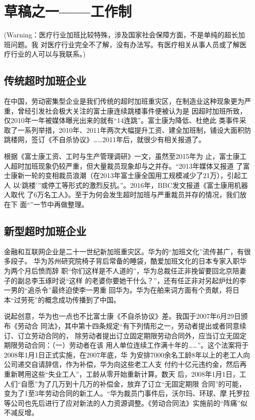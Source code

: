 \chapter{草稿之一——工作制}

(Warning：医疗行业加班比较特殊，涉及国家社会保障方面，不是单纯的超长加班问题。我
对医疗行业完全不了解，没有办法写。有医疗相关从事人员或了解医疗行业的人可以与我联系。)

\section{传统超时加班企业}
在中国，劳动密集型企业是我们传统的超时加班重灾区，在制造业这种现象更为严
重\cite{guojilaogongshijian}，曾经引发社会极大关注的富士康连续跳楼事件便被认为是
因超时加班所致，仅2010年一年被媒体曝光出来的就有“14连跳”。富士康为降低、杜绝此
类事件采取了一系列举措，2010年、2011年两次大幅提升工资、建全加班制，铺设大面积防
跳楼网，签订《不自杀协议》……2011年后，就很少有相关报道了。

根据《富士康工资、工时与生产管理调研》\cite{fushikangzuixin}一文，虽然至2015年为
止，富士康工人超时加班现象仍较严重，但大量裁员现象却与之并存。“2013年媒体又报道
了富士康新一轮的变相裁员浪潮（在2013年富士康全国用工规模减少了21万），引起工人
以`跳楼'”或停工等形式的激烈反抗。”。2016年，BBC发文报道《富士康用机器人取代
了6万名工人》。至于为何会发生超时加班与严重裁员并存的情况，我们放在下
面“”一节中再做整理。

\section{新型超时加班企业}
金融和互联网企业是二十一世纪新加班重灾区。华为的“加班文化”流传甚广，有很多段子。
华为苏州研究院椅子背后常备的睡袋，酷爱加班文化的日本专家入职华为两个月后愤而辞
职“你们这样是不人道的”，华为总裁任正非挽留要回北京陪妻子的副总李玉琢时说“这样
的老婆你要她干什么？”，还有任正非对另起炉灶的李一男的“追杀令”最终迫使李一男重
回华为。华为在舶来词方面有个贡献，将日本“过劳死”的概念成功传播到了中国。

说起创意，华为也一点也不比富士康《不自杀协议》差。我国于2007年6月29日颁布《劳动合
同法》，其中第十四条规定“有下列情形之一，劳动者提出或者同意续订、订立劳动合同的，
除劳动者提出订立固定期限劳动合同外，应当订立无固定期限劳动合同：（一）劳动者在该
用人单位连续工作满十年的……”。这个法案将于2008年1月1日正式实施，在2007年底，华
为安排7000余名工龄8年以上的老工人向公司递交自请辞信，作为补偿，华为向这些老工人支
付约十亿元违约金，然后再重新聘用这些“失业工人”，工龄从零开始重新计算。数天
后，2008年1月1日，工人们“自愿”为了几万到十几万的补偿金，放弃了订立“无固定期限
合同”的可能，变为了1至3年劳动合同的新工人。“华为裁员门事件后，沃尔玛、环球、摩
托罗拉等公司也先后进行了应对新法的人力资源调整。《劳动合同法》实施前的“阵痛”似
不减反增。\cite{huaweimaiduan}

